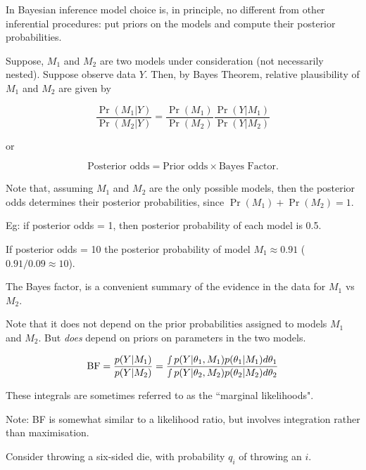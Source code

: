 
\newcommand{\bY}{{\bm{Y}}}
\newcommand{\bX}{{\bm{X}}}
\newcommand{\BF}{\text{BF}}


In Bayesian inference model choice is, in principle, no different
from other inferential procedures: put priors on the models and compute their posterior probabilities.

Suppose, $M_1 $
 and $M_2 $
 are two models under consideration (not necessarily nested).
Suppose  observe data $Y$. Then, by Bayes Theorem, relative plausibility of $M_1$ and $M_2$ are given by

$$\frac{\Pr(M_1 | Y)}{\Pr(M_2 | Y)} = \frac{\Pr(M_1)}{\Pr(M_2)} \frac{\Pr(Y | M_1)}{\Pr(Y | M_2)}$$

or 

$$\text{Posterior odds} = \text{Prior odds} \times \text{Bayes Factor}.$$


Note that, assuming $M_1$ and $M_2$ are the only possible models, then
the posterior odds determines their posterior probabilities, since $\Pr(M_1) + \Pr(M_2) = 1$.

Eg: if posterior odds = 1, then posterior probability of each model is 0.5.

If posterior odds = 10 the posterior probability of model $M_1 \approx  0.91$ ($0.91/0.09 \approx 10$).


The Bayes factor, is a convenient summary of the evidence in the data for $M_1$ vs $M_2$.

Note that it does not depend on the prior probabilities assigned to models
$M_1$ and $M_2$. But {\it does} depend on priors on parameters in the two models.

$$\BF = \frac{{p(Y  |M_1)}}{{p(Y  | M_2)}} =  \frac{{\smallint p(Y|\theta _1 ,M_1 )p(\theta _1 |M_1
)d\theta _1 }}{{\smallint p(Y|\theta _2 ,M_2 )p(\theta _2 |M_2
)d\theta _2 }}$$

These integrals are sometimes referred to as the ``marginal likelihoods".

Note: BF is somewhat similar to a likelihood ratio, but involves integration rather than maximisation.


Consider throwing a six-sided die, with probability $q_i$ of throwing an $i$.

